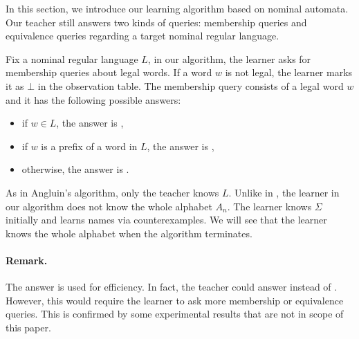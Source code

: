 In this section, we introduce our learning algorithm based on nominal
automata. Our teacher still answers two kinds of queries: membership
queries and equivalence queries regarding a target nominal regular
language.


             
Fix a nominal regular language $L$, in our algorithm, the learner asks for membership queries about legal
words. If a word $w$ is not legal, the learner marks it as
$\bot$ in the observation table. The membership query consists of a
legal word $w$ and it has the following possible answers:
\begin{itemize}
\item if $w\in L$, the answer is ,
\item if $w$ is a prefix of a word in $L$, the answer is ,
\item otherwise, the answer is .
\end{itemize}

As in Angluin's \lstar algorithm, only the teacher knows $L$.
%
Unlike in \lstar, the learner in our algorithm does not know the whole
alphabet $A_n$.
%
The learner knows $\Sigma$ initially and learns names via
counterexamples.
%
We will see that the learner knows the whole alphabet
when the algorithm terminates.
  \paragraph{Remark.}The answer  is used for efficiency. In
  fact, the teacher could answer  instead of . However,
  this would require the learner to ask more membership or equivalence
  queries.
  This is confirmed by some experimental results that are not in scope of this paper.
